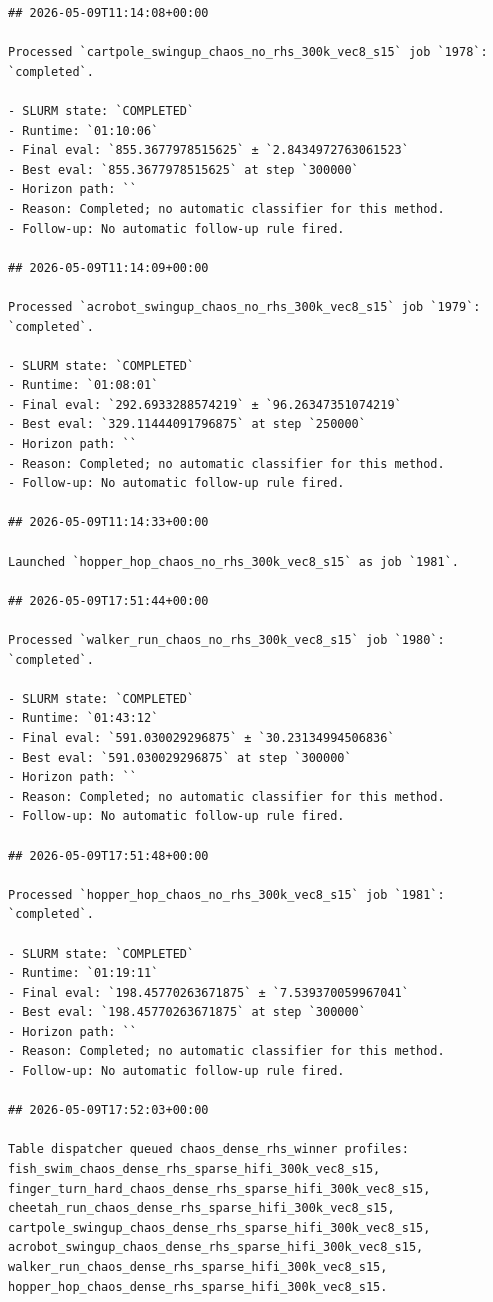 \begin{verbatim}
## 2026-05-09T11:14:08+00:00

Processed `cartpole_swingup_chaos_no_rhs_300k_vec8_s15` job `1978`: `completed`.

- SLURM state: `COMPLETED`
- Runtime: `01:10:06`
- Final eval: `855.3677978515625` ± `2.8434972763061523`
- Best eval: `855.3677978515625` at step `300000`
- Horizon path: ``
- Reason: Completed; no automatic classifier for this method.
- Follow-up: No automatic follow-up rule fired.

## 2026-05-09T11:14:09+00:00

Processed `acrobot_swingup_chaos_no_rhs_300k_vec8_s15` job `1979`: `completed`.

- SLURM state: `COMPLETED`
- Runtime: `01:08:01`
- Final eval: `292.6933288574219` ± `96.26347351074219`
- Best eval: `329.11444091796875` at step `250000`
- Horizon path: ``
- Reason: Completed; no automatic classifier for this method.
- Follow-up: No automatic follow-up rule fired.

## 2026-05-09T11:14:33+00:00

Launched `hopper_hop_chaos_no_rhs_300k_vec8_s15` as job `1981`.

## 2026-05-09T17:51:44+00:00

Processed `walker_run_chaos_no_rhs_300k_vec8_s15` job `1980`: `completed`.

- SLURM state: `COMPLETED`
- Runtime: `01:43:12`
- Final eval: `591.030029296875` ± `30.23134994506836`
- Best eval: `591.030029296875` at step `300000`
- Horizon path: ``
- Reason: Completed; no automatic classifier for this method.
- Follow-up: No automatic follow-up rule fired.

## 2026-05-09T17:51:48+00:00

Processed `hopper_hop_chaos_no_rhs_300k_vec8_s15` job `1981`: `completed`.

- SLURM state: `COMPLETED`
- Runtime: `01:19:11`
- Final eval: `198.45770263671875` ± `7.539370059967041`
- Best eval: `198.45770263671875` at step `300000`
- Horizon path: ``
- Reason: Completed; no automatic classifier for this method.
- Follow-up: No automatic follow-up rule fired.

## 2026-05-09T17:52:03+00:00

Table dispatcher queued chaos_dense_rhs_winner profiles: fish_swim_chaos_dense_rhs_sparse_hifi_300k_vec8_s15, finger_turn_hard_chaos_dense_rhs_sparse_hifi_300k_vec8_s15, cheetah_run_chaos_dense_rhs_sparse_hifi_300k_vec8_s15, cartpole_swingup_chaos_dense_rhs_sparse_hifi_300k_vec8_s15, acrobot_swingup_chaos_dense_rhs_sparse_hifi_300k_vec8_s15, walker_run_chaos_dense_rhs_sparse_hifi_300k_vec8_s15, hopper_hop_chaos_dense_rhs_sparse_hifi_300k_vec8_s15.


\end{verbatim}
